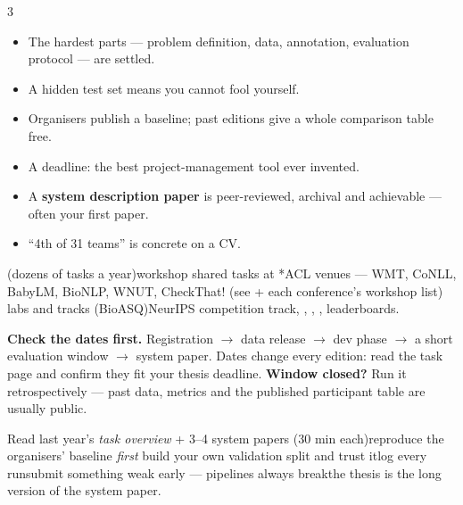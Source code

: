 \documentclass[10pt,a4paper]{article}
\begin{document}
\begin{multicols}{3}
\begin{itemize}
  \item The hardest parts --- problem definition, data, annotation, evaluation
        protocol --- are settled.
  \item A hidden test set means you cannot fool yourself.
  \item Organisers publish a baseline; past editions give a whole comparison
        table free.
  \item A deadline: the best project-management tool ever invented.
  \item A \textbf{system description paper} is peer-reviewed, archival and
        achievable --- often your first paper.
  \item ``4th of 31 teams'' is concrete on a CV.
\end{itemize}
 (dozens of
tasks a year)\dt workshop shared tasks at *ACL venues --- WMT, CoNLL, BabyLM,
BioNLP, WNUT, CheckThat! (see  +
each conference's workshop list)\dt
{} labs and
 tracks (BioASQ)\dt NeurIPS competition
track\dt {},
,
, ,
\dt
{} leaderboards.
\begin{flag}
\textbf{Check the dates first.} Registration $\to$ data release $\to$ dev phase
$\to$ a short evaluation window $\to$ system paper. Dates change every edition:
read the task page and confirm they fit your thesis deadline.
\textbf{Window closed?} Run it retrospectively --- past data, metrics and the
published participant table are usually public.
\end{flag}
Read last year's \emph{task overview} + 3--4 system
papers (30 min each)\dt reproduce the organisers' baseline \emph{first}\dt
build your own validation split and trust it\dt log every run\dt submit
something weak early --- pipelines always break\dt the thesis is the long
version of the system paper.


\end{multicols}
\end{document}
